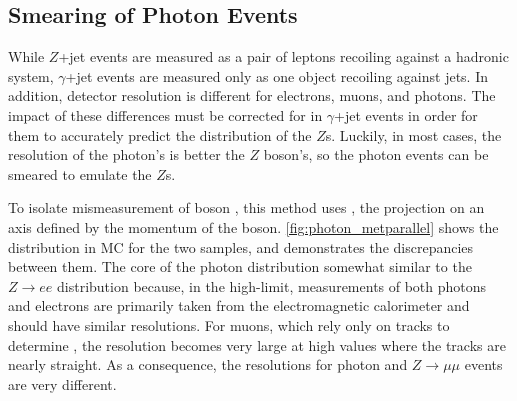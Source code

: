 \subsection{Smearing of Photon Events}
\label{sec:photon_smearing}

While $Z$+jet events are measured as a pair of leptons recoiling against a hadronic system, $\gamma$+jet events are measured only as one  object recoiling against jets. In addition, detector resolution is different for electrons, muons, and photons. The impact of these differences must be corrected for in $\gamma$+jet events in order for them to accurately predict the \met distribution of the $Z$s. Luckily, in most cases, the resolution of the photon's \pt is better the $Z$ boson's, so the photon events can be smeared to emulate the $Z$s.  

To isolate mismeasurement of boson \pt, this method uses \metl, the \met projection on an axis defined by the momentum of the boson. \autoref{fig:photon_metparallel} shows the \metl distribution in \ac{MC} for the two samples, and demonstrates the discrepancies between them. The core of the photon distribution somewhat similar to the $Z\rightarrow ee$ distribution because, in the high-\pt limit, measurements of both photons and electrons are primarily taken from the electromagnetic calorimeter and should have similar resolutions. For muons, which rely only on tracks to determine \pt, the resolution becomes very large at high \pt values where the tracks are nearly straight. As a consequence, the resolutions for photon and $Z\rightarrow\mu\mu$ events are very different. 

